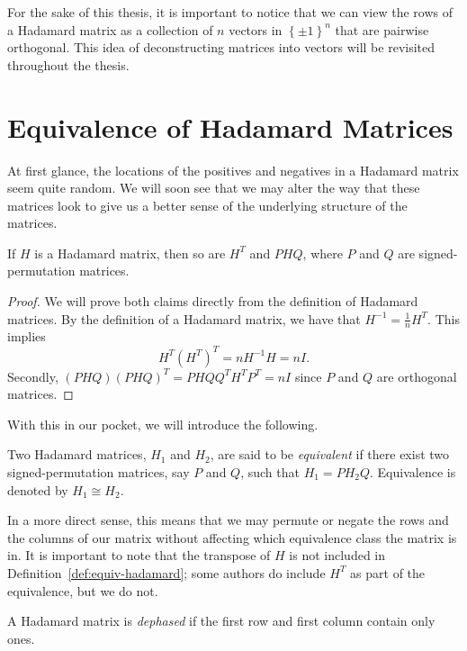 For the sake of this thesis, it is important to notice that we can view the rows of a Hadamard matrix as a collection of $n$ vectors in $\left\{\pm1\right\}^n$ that are pairwise orthogonal. This idea of deconstructing matrices into vectors will be revisited throughout the thesis.

\section[Equivalence of Hadamard Matrices]{Equivalence of Hadamard Matrices}
\label{sec:equiv}

At first glance, the locations of the positives and negatives in a Hadamard matrix seem quite random. We will soon see that we may alter the way that these matrices look to give us a better sense of the underlying structure of the matrices.

\begin{proposition} \label{prop:equiv-hadamard}
 If $H$ is a Hadamard matrix, then so are $H^T$ and $PHQ$, where $P$ and $Q$ are signed-permutation matrices.
 \begin{proof}
  We will prove both claims directly from the definition of Hadamard matrices. By the definition of a Hadamard matrix, we have that $H^{-1} = \frac{1}{n}H^T$. This implies $$H^T\left(H^T\right)^T = nH^{-1}H = nI.$$ Secondly, $\left(PHQ\right)\left(PHQ\right)^T = PHQQ^TH^TP^T = nI$ since $P$ and $Q$ are orthogonal matrices.
 \end{proof}
\end{proposition}

With this in our pocket, we will introduce the following.

\begin{definition} \label{def:equiv-hadamard}
 Two Hadamard matrices, $H_1$ and $H_2$, are said to be {\it equivalent} if there exist two signed-permutation matrices, say $P$ and $Q$, such that $H_1 = PH_2Q$. Equivalence is denoted by $H_1 \cong H_2$.
\end{definition}
In a more direct sense, this means that we may permute or negate the rows and the columns of our matrix without affecting which equivalence class the matrix is in. It is important to note that the transpose of $H$ is not included in Definition~\ref{def:equiv-hadamard}; some authors do include $H^T$ as part of the equivalence, but we do not.

\begin{definition} \label{def:dephased}
 A Hadamard matrix is {\it dephased} if the first row and first column contain only ones.
\end{definition}

